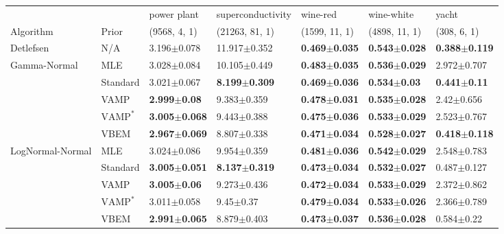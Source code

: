 \begin{tabular}{lllllll}
\midrule
                 &      &               power plant &         superconductivity &                  wine-red &                wine-white &                     yacht \\
Algorithm & Prior& (9568, 4, 1)& (21263, 81, 1)& (1599, 11, 1)& (4898, 11, 1)& (308, 6, 1)\\
\midrule
Detlefsen & N/A &           3.196$\pm$0.078 &          11.917$\pm$0.352 &  \textbf{0.469$\pm$0.035} &  \textbf{0.543$\pm$0.028} &  \textbf{0.388$\pm$0.119} \\
Gamma-Normal & MLE &           3.028$\pm$0.084 &          10.105$\pm$0.449 &  \textbf{0.483$\pm$0.035} &  \textbf{0.536$\pm$0.029} &           2.972$\pm$0.707 \\
                 & Standard &           3.021$\pm$0.067 &  \textbf{8.199$\pm$0.309} &  \textbf{0.469$\pm$0.036} &   \textbf{0.534$\pm$0.03} &   \textbf{0.441$\pm$0.11} \\
                 & VAMP &   \textbf{2.999$\pm$0.08} &           9.383$\pm$0.359 &  \textbf{0.478$\pm$0.031} &  \textbf{0.535$\pm$0.028} &            2.42$\pm$0.656 \\
                 & $\text{VAMP}^*$ &  \textbf{3.005$\pm$0.068} &           9.443$\pm$0.388 &  \textbf{0.475$\pm$0.036} &  \textbf{0.533$\pm$0.029} &           2.523$\pm$0.767 \\
                 & VBEM &  \textbf{2.967$\pm$0.069} &           8.807$\pm$0.338 &  \textbf{0.471$\pm$0.034} &  \textbf{0.528$\pm$0.027} &  \textbf{0.418$\pm$0.118} \\
LogNormal-Normal & MLE &           3.024$\pm$0.086 &           9.954$\pm$0.359 &  \textbf{0.481$\pm$0.036} &  \textbf{0.542$\pm$0.029} &           2.548$\pm$0.783 \\
                 & Standard &  \textbf{3.005$\pm$0.051} &  \textbf{8.137$\pm$0.319} &  \textbf{0.473$\pm$0.034} &  \textbf{0.532$\pm$0.027} &           0.487$\pm$0.127 \\
                 & VAMP &   \textbf{3.005$\pm$0.06} &           9.273$\pm$0.436 &  \textbf{0.472$\pm$0.034} &  \textbf{0.533$\pm$0.029} &           2.372$\pm$0.862 \\
                 & $\text{VAMP}^*$ &           3.011$\pm$0.058 &             9.45$\pm$0.37 &  \textbf{0.479$\pm$0.034} &  \textbf{0.533$\pm$0.026} &           2.366$\pm$0.789 \\
                 & VBEM &  \textbf{2.991$\pm$0.065} &           8.879$\pm$0.403 &  \textbf{0.473$\pm$0.037} &  \textbf{0.536$\pm$0.028} &            0.584$\pm$0.22 \\
\bottomrule
\end{tabular}

